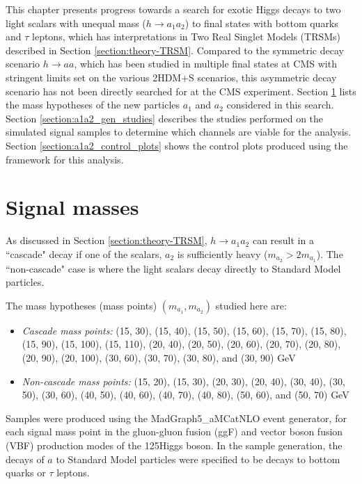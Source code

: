 This chapter presents progress towards a search for exotic Higgs decays to two light scalars with unequal mass ($h \rightarrow a_1 a_2$) to final states with bottom quarks and $\tau$ leptons, which has interpretations in Two Real Singlet Models (TRSMs) described in Section \ref{section:theory-TRSM}.  Compared to the symmetric decay scenario $h\rightarrow aa$, which has been studied in multiple final states at CMS with stringent limits set on the various 2HDM+S scenarios, this asymmetric decay scenario has not been directly searched for at the CMS experiment. Section \ref{section:a1a2_masses} lists the mass hypotheses of the new particles $a_1$ and $a_2$ considered in this search. Section \ref{section:a1a2_gen_studies} describes the studies performed on the simulated signal samples to determine which channels are viable for the analysis. Section \ref{section:a1a2_control_plots} shows the control plots produced using the framework for this analysis.

\section{Signal masses}
\label{section:a1a2_masses}
As discussed in Section \ref{section:theory-TRSM}, $h \rightarrow a_1 a_2$ can result in a ``cascade" decay if one of the scalars, $a_2$ is sufficiently heavy ($m_{a_2} > 2m_{a_1}$). The ``non-cascade" case is where the light scalars decay directly to Standard Model particles. 

The mass hypotheses (mass points) $(m_{a_1}, m_{a_2})$ studied here are:
\begin{itemize}
    \item \textit{Cascade mass points:} (15, 30), (15, 40), (15, 50), (15, 60), (15, 70), (15, 80), (15, 90), (15, 100), (15, 110), (20, 40), (20, 50), (20, 60), (20, 70), (20, 80), (20, 90), (20, 100), (30, 60), (30, 70), (30, 80), and (30, 90) GeV
    \item \textit{Non-cascade mass points:} (15, 20), (15, 30), (20, 30), (20, 40), (30, 40), (30, 50), (30, 60), (40, 50), (40, 60), (40, 70), (40, 80), (50, 60), and (50, 70) GeV
\end{itemize}
Samples were produced using the MadGraph5\_aMCatNLO event generator, for each signal mass point in the gluon-gluon fusion (ggF) and vector boson fusion (VBF) production modes of the 125\GeV Higgs boson. In the sample generation, the decays of $a$ to Standard Model particles were specified to be decays to bottom quarks or $\tau$ leptons.


